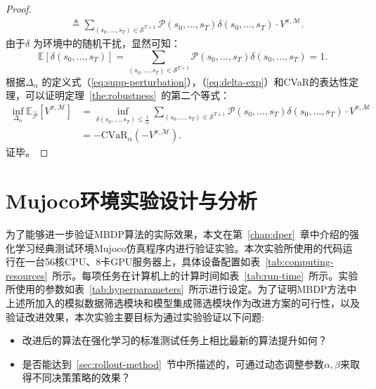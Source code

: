 \begin{proof}
\begin{equation}
\begin{aligned}
    &\triangleq \sum_{(s_0,\ldots,s_T)\in\mathcal{S}^{T+1}}\mathcal{P}(s_0,\ldots,s_T)\delta(s_0,\ldots,s_T)\cdot V^{\pi,\mathcal{M}}.
\end{aligned}
\end{equation}
由于$\delta$ 为环境中的随机干扰，显然可知：
\begin{equation}\label{eq:delta-exp}
    \mathbb{E}\left[\delta(s_0,\ldots,s_T)\right] = \sum_{(s_0,\ldots,s_T)\in\mathcal{S}^{T+1}}\mathcal{P}(s_0,\ldots,s_T)\delta(s_0,\ldots,s_T) = 1.
\end{equation}
根据$\Delta_\alpha$ 的定义式（\ref{eq:supp-perturbation}），（\ref{eq:delta-exp}）和CVaR的表达性定理\cite{chow2015risk}，可以证明定理~\ref{the:robustness}~的第二个等式：
\begin{equation}
\begin{aligned}
    \inf\limits_{\Delta_\alpha}\mathbb{E}_{\hat{\mathcal{P}}}[V^{\pi,\mathcal{M}}] &= \inf\limits_{\delta(s_0,\ldots,s_T)\leq\frac{1}{\alpha}}\sum_{(s_0,\ldots,s_T)\in\mathcal{S}^{T+1}}\mathcal{P}(s_0,\ldots,s_T)\delta(s_0,\ldots,s_T)\cdot V^{\pi,\mathcal{M}}\\
    &=-\mathrm{CVaR}_\alpha(-V^{\pi,\mathcal{M}}).
\end{aligned}
\label{proof:cvar-eq}
\end{equation}
证毕。
\end{proof}

\section{Mujoco环境实验设计与分析}

为了能够进一步验证MBDP算法的实际效果，本文在第~\ref{chap:dper}~章中介绍的强化学习经典测试环境Mujoco仿真程序内进行验证实验。本次实验所使用的代码运行在一台56核CPU、8卡GPU服务器上，具体设备配置如表~\ref{tab:computing-resources}~所示。每项任务在计算机上的计算时间如表~\ref{tab:run-time}~所示。实验所使用的参数如表~\ref{tab:hyperparameters}~所示进行设定。为了证明MBDP方法中上述所加入的模拟数据筛选模块和模型集成筛选模块作为改进方案的可行性，以及验证改进效果，本次实验主要目标为通过实验验证以下问题:

\begin{itemize}
    \item 改进后的算法在强化学习的标准测试任务上相比最新的算法提升如何？
    \item 是否能达到~\ref{sec:rollout-method}~节中所描述的，可通过动态调整参数$\alpha,\beta$来取得不同决策策略的效果？
\end{itemize}

